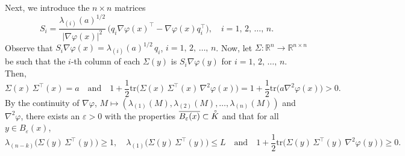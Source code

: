 \documentclass[11pt]{amsart}
\numberwithin{equation}{section}
\begin{document}
\medskip

Next, we introduce the $n\times n$ matrices
\begin{equation}
S_i = \frac{\lambda_{(i)}(a)^{1/2}}{|\nabla\varphi(x)|^2}\,
\big(q_i\nabla\varphi(x)^{\top}-\nabla\varphi(x)q_i^{\top}\big),\quad i=1,\,2,\,\ldots,\,n.
\end{equation}
Observe that $S_i\nabla \varphi(x) = \lambda_{(i)}(a)^{1/2}\,q_i$, $i=1,\,2,\,\ldots,\,n$. Now, let $\Sigma\!:{\mathbb R}^n\to{\mathbb R}^{n\times n}$ be such that the $i$-th column of each $\Sigma(y)$ is $S_i\nabla\varphi(y)$ for $i=1,\,2,\,\ldots,\,n$. Then, 
\begin{equation}
\Sigma(x)\,\Sigma^{\top}(x)=a \quad\text{and}\quad 1+\frac{1}{2}\text{tr}\big(\Sigma(x)\,\Sigma^{\top}(x)\,\nabla^2\varphi(x)\big) 
= 1 + \frac{1}{2}\text{tr}\big(a\nabla^2\varphi(x)\big)>0. 
\end{equation}
By the continuity of $\nabla\varphi$, $M\mapsto(\lambda_{(1)}(M),\lambda_{(2)}(M),\ldots,\lambda_{(n)}(M))$ and $\nabla^2\varphi$, there exists an $\varepsilon>0$ with the properties  $\overline{B_{\varepsilon}( x)}\subset\accentset{\circ}{K}$ and that for all $y\in B_{\varepsilon}(x)$,
\begin{equation}\label{Sigma cond}
\lambda_{(n-k)}\big(\Sigma(y)\,\Sigma^{\top}(y)\big)\ge 1,\quad
\lambda_{(1)}\big(\Sigma(y)\,\Sigma^{\top}(y)\big)\le L\quad \text{and} \quad 1+\frac{1}{2}\text{tr}\big(\Sigma(y)\,\Sigma^{\top}(y)\,\nabla^2\varphi(y)\big) \ge 0.
\end{equation}

\smallskip
\end{document}
